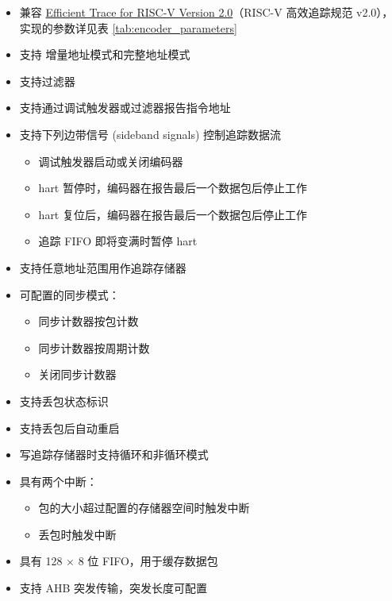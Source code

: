 \documentclass[main\_\_CN.tex]{subfiles}
\begin{document}
\begin{itemize}
    \item 兼容 \href{https://github.com/riscv-non-isa/riscv-trace-spec/releases}{Efficient Trace for RISC-V Version 2.0}（RISC-V 高效追踪规范 v2.0），实现的参数详见表 \ref{tab:encoder_parameters}
    \item 支持 增量地址模式和完整地址模式
    \item 支持过滤器
    \item 支持通过调试触发器或过滤器报告指令地址
    \item 支持下列边带信号 (sideband signals) 控制追踪数据流
        \begin{itemize}
            \item 调试触发器启动或关闭编码器
            \item hart 暂停时，编码器在报告最后一个数据包后停止工作
            \item hart 复位后，编码器在报告最后一个数据包后停止工作
            \item 追踪 FIFO 即将变满时暂停 hart
        \end{itemize}
    \item 支持任意地址范围用作追踪存储器
    \item 可配置的同步模式：
        \begin{itemize}
            \item 同步计数器按包计数
            \item 同步计数器按周期计数
            \item 关闭同步计数器
        \end{itemize}
    \item 支持丢包状态标识
    \item 支持丢包后自动重启
    \item 写追踪存储器时支持循环和非循环模式
    \item 具有两个中断：
        \begin{itemize}
            \item 包的大小超过配置的存储器空间时触发中断
            \item 丢包时触发中断
        \end{itemize}
    \item 具有 128 × 8 位 FIFO，用于缓存数据包
    \item 支持 AHB 突发传输，突发长度可配置
\end{itemize}
\end{document}
